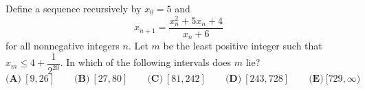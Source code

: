 Define a sequence recursively by $x_0=5$ and
\[
x_{n+1}=\dfrac{x_n^2+5x_n+4}{x_n+6}
\]
for all nonnegative integers $n$. Let $m$ be the least positive integer such that $x_m\le4+\dfrac{1}{2^{20}}$. In which of the following intervals does $m$ lie?
\[
\textbf{(A)}\ [9,26]\qquad\textbf{(B)}\ [27,80]\qquad\textbf{(C)}\ [81,242]\qquad\textbf{(D)}\ [243,728]\qquad\textbf{(E)}\ [729,\infty)
\]
